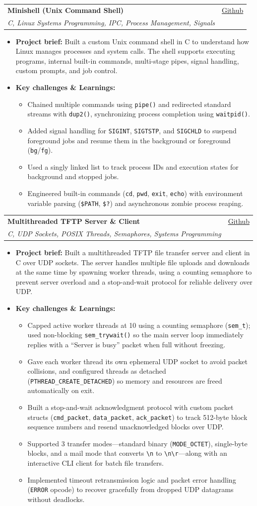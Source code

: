 \documentclass[letterpaper,11pt]{article}
\makeatletter
\newcommand{\resumeItem}[1]{
  \item
    {#1 \vspace{-2pt}}
}
\newcommand{\resumeSubheading}[4]{
  \vspace{-2pt}\item
    \begin{tabular*}{0.97\textwidth}[t]{l@{\extracolsep{\fill}}r}
      \textbf{#1} & #2 \\
      \textit{#3} & {#4} \\
    \end{tabular*}\vspace{-7pt}
}
\newcommand{\resumeItemListStart}{\begin{itemize}[topsep=2pt, itemsep=2pt, parsep=0pt]}
\newcommand{\resumeItemListEnd}{\end{itemize}\vspace{-5pt}}
\makeatother
\begin{document}
    \resumeSubheading
      {Minishell (Unix Command Shell)}{\href{https://github.com/k0-R0/Minishell}{Github}}
      {C, Linux Systems Programming, IPC, Process Management, Signals}{}
      \resumeItemListStart
        \resumeItem{\textbf{Project brief:} Built a custom Unix command shell in C to understand how Linux manages processes and system calls. The shell supports executing programs, internal built-in commands, multi-stage pipes, signal handling, custom prompts, and job control.}
        \resumeItem{\textbf{Key challenges \& Learnings:}}
        \resumeItemListStart
            \resumeItem{Chained multiple commands using \texttt{pipe()} and redirected standard streams with \texttt{dup2()}, synchronizing process completion using \texttt{waitpid()}.}
            \resumeItem{Added signal handling for \texttt{SIGINT}, \texttt{SIGTSTP}, and \texttt{SIGCHLD} to suspend foreground jobs and resume them in the background or foreground (\texttt{bg}/\texttt{fg}).}
            \resumeItem{Used a singly linked list to track process IDs and execution states for background and stopped jobs.}
            \resumeItem{Engineered built-in commands (\texttt{cd}, \texttt{pwd}, \texttt{exit}, \texttt{echo}) with environment variable parsing (\texttt{\$PATH}, \texttt{\$?}) and asynchronous zombie process reaping.}
        \resumeItemListEnd
      \resumeItemListEnd

    \resumeSubheading
      {Multithreaded TFTP Server \& Client}{\href{https://github.com/k0-R0/TFTP}{Github}}
      {C, UDP Sockets, POSIX Threads, Semaphores, Systems Programming}{}
      \resumeItemListStart
        \resumeItem{\textbf{Project brief:} Built a multithreaded TFTP file transfer server and client in C over UDP sockets. The server handles multiple file uploads and downloads at the same time by spawning worker threads, using a counting semaphore to prevent server overload and a stop-and-wait protocol for reliable delivery over UDP.}
        \resumeItem{\textbf{Key challenges \& Learnings:}}
        \resumeItemListStart
            \resumeItem{Capped active worker threads at 10 using a counting semaphore (\texttt{sem\_t}); used non-blocking \texttt{sem\_trywait()} so the main server loop immediately replies with a ``Server is busy'' packet when full without freezing.}
            \resumeItem{Gave each worker thread its own ephemeral UDP socket to avoid packet collisions, and configured threads as detached (\texttt{PTHREAD\_CREATE\_DETACHED}) so memory and resources are freed automatically on exit.}
            \resumeItem{Built a stop-and-wait acknowledgment protocol with custom packet structs (\texttt{cmd\_packet}, \texttt{data\_packet}, \texttt{ack\_packet}) to track 512-byte block sequence numbers and resend unacknowledged blocks over UDP.}
            \resumeItem{Supported 3 transfer modes---standard binary (\texttt{MODE\_OCTET}), single-byte blocks, and a mail mode that converts \texttt{\textbackslash n} to \texttt{\textbackslash n\textbackslash r}---along with an interactive CLI client for batch file transfers.}
            \resumeItem{Implemented timeout retransmission logic and packet error handling (\texttt{ERROR} opcode) to recover gracefully from dropped UDP datagrams without deadlocks.}
        \resumeItemListEnd
      \resumeItemListEnd
\end{document}
